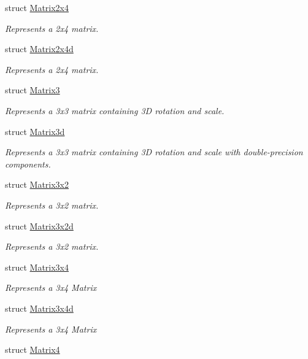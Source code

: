 \begin{DoxyCompactItemize}
struct \hyperlink{struct_open_t_k_1_1_matrix2x4}{Matrix2x4}
\begin{DoxyCompactList}\small\item\em Represents a 2x4 matrix. \end{DoxyCompactList}\item 
struct \hyperlink{struct_open_t_k_1_1_matrix2x4d}{Matrix2x4d}
\begin{DoxyCompactList}\small\item\em Represents a 2x4 matrix. \end{DoxyCompactList}\item 
struct \hyperlink{struct_open_t_k_1_1_matrix3}{Matrix3}
\begin{DoxyCompactList}\small\item\em Represents a 3x3 matrix containing 3\-D rotation and scale. \end{DoxyCompactList}\item 
struct \hyperlink{struct_open_t_k_1_1_matrix3d}{Matrix3d}
\begin{DoxyCompactList}\small\item\em Represents a 3x3 matrix containing 3\-D rotation and scale with double-\/precision components. \end{DoxyCompactList}\item 
struct \hyperlink{struct_open_t_k_1_1_matrix3x2}{Matrix3x2}
\begin{DoxyCompactList}\small\item\em Represents a 3x2 matrix. \end{DoxyCompactList}\item 
struct \hyperlink{struct_open_t_k_1_1_matrix3x2d}{Matrix3x2d}
\begin{DoxyCompactList}\small\item\em Represents a 3x2 matrix. \end{DoxyCompactList}\item 
struct \hyperlink{struct_open_t_k_1_1_matrix3x4}{Matrix3x4}
\begin{DoxyCompactList}\small\item\em Represents a 3x4 Matrix \end{DoxyCompactList}\item 
struct \hyperlink{struct_open_t_k_1_1_matrix3x4d}{Matrix3x4d}
\begin{DoxyCompactList}\small\item\em Represents a 3x4 Matrix \end{DoxyCompactList}\item 
struct \hyperlink{struct_open_t_k_1_1_matrix4}{Matrix4}

\end{DoxyCompactItemize}
